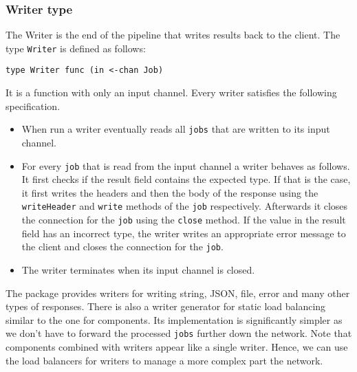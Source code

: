 \subsubsection{Writer type}
The Writer is the end of the pipeline that writes results back to the client.
The type \texttt{Writer} is defined as follows:
\begin{lstlisting}
type Writer func (in <-chan Job)
\end{lstlisting}
It is a function with only an input channel.
Every writer satisfies the following specification.
\begin{itemize}
    \item When run a writer eventually reads all \texttt{jobs} that are written 
          to its input channel.

	\item For every \texttt{job} that is  read from the input channel a writer 
          behaves as follows. It first checks if the result field 
          contains the expected type. If that is the case, it first 
          writes the headers and then the body of the response using 
          the \texttt{writeHeader} and \texttt{write} methods of the \texttt{job} respectively. Afterwards it closes the connection for the \texttt{job} 
          using the \texttt{close} method. If the value in the result 
          field has an incorrect type, the writer writes an appropriate 
          error message to the client and closes the connection for the 
          \texttt{job}. 

	\item The writer terminates when its input channel is closed.
\end{itemize}
The package provides writers for writing string, JSON, file, error and many
other types of responses. There is also a writer generator for static
load balancing similar to the one for components. Its implementation
is significantly simpler as we don't have to forward the processed
\texttt{jobs} further down the network. Note that components
combined with writers appear like a single writer. Hence, we can use the
load balancers for writers to manage a more complex part the network.

